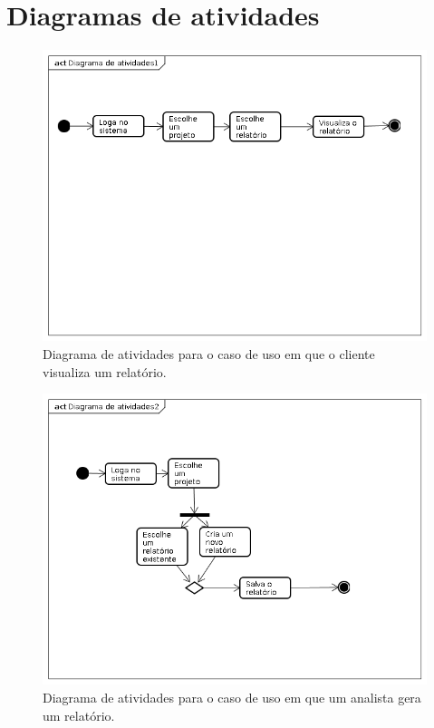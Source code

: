 \section{Diagramas de atividades}

\begin{figure}[hb]
    \begin{center}
        \includegraphics[scale=0.5]{img/atividade1.png}
        \caption{Diagrama de atividades para o caso de uso em que o
            cliente visualiza um relatório.}
        \label{fig:atividade-visualiza}
    \end{center}
\end{figure}

\begin{figure}[hb]
    \begin{center}
        \includegraphics[scale=0.5]{img/atividade2.png}
        \caption{Diagrama de atividades para o caso de uso em que um
            analista gera um relatório.}
        \label{fig:atividade-analisa}
    \end{center}
\end{figure}


